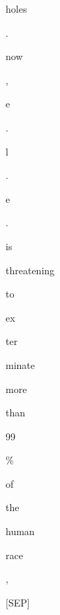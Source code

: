 \documentclass[varwidth=150mm]{standalone}
\begin{document}
\begin{CJK*}{UTF8}{gbsn}
{{{\colorbox{red!2.0802860260009766}{\strut holes} \colorbox{red!0.0}{\strut .} \colorbox{red!5.004939079284668}{\strut now} \colorbox{red!12.03858757019043}{\strut ,} \colorbox{red!11.744991302490234}{\strut e} \colorbox{red!2.8824172019958496}{\strut .} \colorbox{red!0.0}{\strut l} \colorbox{red!1.4032282829284668}{\strut .} \colorbox{red!7.151976585388184}{\strut e} \colorbox{red!1.4185361862182617}{\strut .} \colorbox{red!31.582307815551758}{\strut is} \colorbox{red!1.0694105625152588}{\strut threatening} \colorbox{red!4.27777624130249}{\strut to} \colorbox{red!6.0478315353393555}{\strut ex}\colorbox{red!1.0643508434295654}{\strut ter}\colorbox{red!6.8406453132629395}{\strut minate} \colorbox{red!0.0}{\strut more} \colorbox{red!1.933585524559021}{\strut than} \colorbox{red!0.0}{\strut 99} \colorbox{red!0.0}{\strut \%} \colorbox{red!1.950663685798645}{\strut of} \colorbox{red!1.4645828008651733}{\strut the} \colorbox{red!23.16338539123535}{\strut human} \colorbox{red!10.210309982299805}{\strut race} \colorbox{red!99.99999237060547}{\strut ,} \colorbox{red!10.076519966125488}{\strut [SEP]}
}}}
\end{CJK*}
\end{document}
